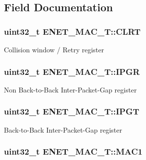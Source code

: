 \subsection{Field Documentation}
\hypertarget{structENET__MAC__T_afdf0e932f04510c6e77bb13a4592cf13}{
\subsubsection[{C\-L\-R\-T}]{ uint32\-\_\-t E\-N\-E\-T\-\_\-\-M\-A\-C\-\_\-\-T\-::\-C\-L\-R\-T}}\label{structENET__MAC__T_afdf0e932f04510c6e77bb13a4592cf13}
Collision window / Retry register \hypertarget{structENET__MAC__T_adcccddf8623def0f5a9aeee408312664}{
\subsubsection[{I\-P\-G\-R}]{ uint32\-\_\-t E\-N\-E\-T\-\_\-\-M\-A\-C\-\_\-\-T\-::\-I\-P\-G\-R}}\label{structENET__MAC__T_adcccddf8623def0f5a9aeee408312664}
Non Back-\/to-\/\-Back Inter-\/\-Packet-\/\-Gap register \hypertarget{structENET__MAC__T_ac73d8d2cf290a3b9dc117340fc093d7e}{
\subsubsection[{I\-P\-G\-T}]{ uint32\-\_\-t E\-N\-E\-T\-\_\-\-M\-A\-C\-\_\-\-T\-::\-I\-P\-G\-T}}\label{structENET__MAC__T_ac73d8d2cf290a3b9dc117340fc093d7e}
Back-\/to-\/\-Back Inter-\/\-Packet-\/\-Gap register \hypertarget{structENET__MAC__T_a1e758365774fda3ac9c11922c4a7ef35}{
\subsubsection[{M\-A\-C1}]{ uint32\-\_\-t E\-N\-E\-T\-\_\-\-M\-A\-C\-\_\-\-T\-::\-M\-A\-C1}}\label{structENET__MAC__T_a1e758365774fda3ac9c11922c4a7ef35}
